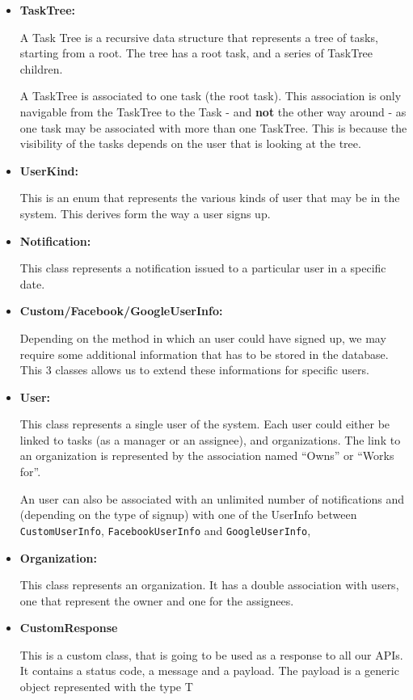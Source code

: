 \documentclass{article}
\begin{document}
\begin{itemize}
    \item \textbf{TaskTree: }
    
    A Task Tree is a recursive data structure that represents a tree of tasks, starting from a root.
    The tree has a root task, and a series of TaskTree children.

    A TaskTree is associated to one task (the root task). This association is only navigable from the TaskTree to the Task - and \textbf{not} the other way around - 
    as one task may be associated with more than one TaskTree. This is because
    the visibility of the tasks depends on the user that is looking at the tree.

    \item \textbf{UserKind: }

    This is an enum that represents the various kinds of user that may be in the system.
    This derives form the way a user signs up.

    \item \textbf{Notification: }
    
    This class represents a notification issued to a particular user in a specific date.

    \item \textbf{Custom/Facebook/GoogleUserInfo: }
    
    Depending on the method in which an user could have signed up, we may require some additional
    information that has to be stored in the database. This 3 classes allows us to extend these informations
    for specific users.

    \item \textbf{User: }
    
    This class represents a single user of the system. Each user could either be linked to tasks (as a manager or an assignee),
    and organizations.
    The link to an organization is represented by the association named ``Owns'' or ``Works for''.

    An user can also be associated with an unlimited number of notifications and (depending on the type of signup) 
    with one of the UserInfo between \texttt{CustomUserInfo}, \texttt{FacebookUserInfo} and \texttt{GoogleUserInfo},

    \item \textbf{Organization: }
    
    This class represents an organization. It has a double association with users, one that represent the owner and one for the assignees.

    \item \textbf{CustomResponse}

    This is a custom class, that is going to be used as a response to all our APIs.
    It contains a status code, a message and a payload.
    The payload is a generic object represented with the type T
\end{itemize}
\end{document}

